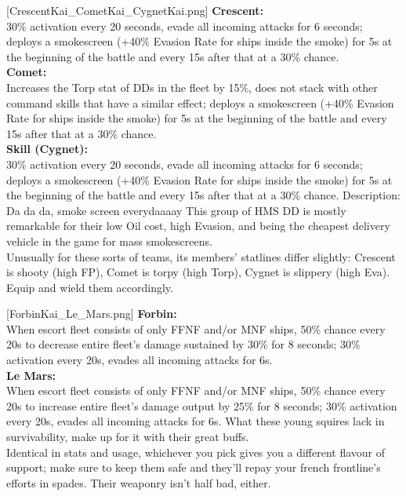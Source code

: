 [CrescentKai_CometKai_CygnetKai.png]
{\textbf{Crescent:}\\
30\% activation every 20 seconds, evade all incoming attacks for 6 seconds; deploys a smokescreen (+40\% Evasion Rate for ships inside the smoke) for 5s at the beginning of the battle and every 15s after that at a 30\% chance. \\
\textbf{Comet:}\\
Increases the Torp stat of DDs in the fleet by 15\%, does not stack with other command skills that have a similar effect; deploys a smokescreen (+40\% Evasion Rate for ships inside the smoke) for 5s at the beginning of the battle and every 15s after that at a 30\% chance.\\
\textbf{Skill (Cygnet):}\\
30\% activation every 20 seconds, evade all incoming attacks for 6 seconds; deploys a smokescreen (+40\% Evasion Rate for ships inside the smoke) for 5s at the beginning of the battle and every 15s after that at a 30\% chance.}
{Description: Da da da, smoke screen everydaaaay}
{This group of HMS DD is mostly remarkable for their low Oil cost, high Evasion, and being the cheapest delivery vehicle in the game for mass smokescreens.\\
Unusually for these sorts of teams, its members' statlines differ slightly: Crescent is shooty (high FP), Comet is torpy (high Torp), Cygnet is slippery (high Eva). Equip and wield them accordingly.}

[ForbinKai_Le_Mars.png]
{\textbf{Forbin:}\\
When escort fleet consists of only FFNF and/or MNF ships, 50\% chance every 20s to decrease entire fleet's damage sustained by 30\% for 8 seconds; 30\% activation every 20s, evades all incoming attacks for 6s.\\
\textbf{Le Mars:}\\
When escort fleet consists of only FFNF and/or MNF ships, 50\% chance every 20s to increase entire fleet's damage output by 25\% for 8 seconds; 30\% activation every 20s, evades all incoming attacks for 6s.}
{}
{What these young squires lack in survivability, make up for it with their great buffs.\\
Identical in stats and usage, whichever you pick gives you a different flavour of support; make sure to keep them safe and they'll repay your french frontline's efforts in spades. Their weaponry isn't half bad, either.}

